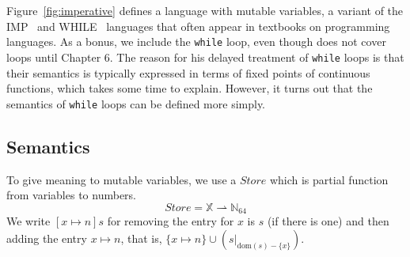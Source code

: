 \documentclass{tufte-handout}
\newcommand{\pto}[0]{\rightharpoonup}
\newcommand{\FNAT}[0]{\mathbb{N}_{64}}
\newcommand{\VAR}[0]{\mathbb{X}}
\newcommand{\STORE}[0]{\mathit{Store}}
\begin{document}

Figure~\ref{fig:imperative} defines a language with mutable variables,
a variant of the
IMP~\citep{Plotkin:1983aa,Winskel:1993uq,Amadio:1998fk} and
WHILE~\citep{Hoare:1969kw} languages that often appear in textbooks on
programming languages. As a bonus, we include the \texttt{while} loop,
even though \citet{Schmidt:1986vn} does not cover loops until Chapter
6. The reason for his delayed treatment of \texttt{while} loops is
that their semantics is typically expressed in terms of fixed points
of continuous functions, which takes some time to explain. However, it
turns out that the semantics of \texttt{while} loops can be defined
more simply.

\subsection{Semantics}

To give meaning to mutable variables, we use a $\STORE$ which
is partial function from variables to numbers.
\[
  \STORE = \VAR \pto \FNAT
\]
We write $[x\mapsto n]s$ for removing the entry for $x$ is $s$
(if there is one) and then adding the entry $x\mapsto n$,
that is, $\{x\mapsto n\} \cup (s|_{\mathrm{dom}(s)-\{x\}})$.
\end{document}
